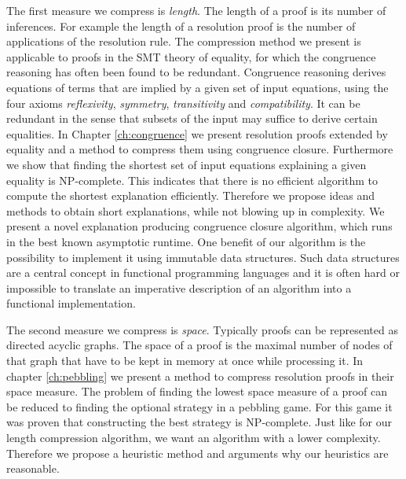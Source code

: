The first measure we compress is \emph{length}.
The length of a proof is its number of inferences.
For example the length of a resolution proof is the number of applications of the resolution rule.
The compression method we present is applicable to proofs in the SMT theory of equality, for which the congruence reasoning has often been found to be redundant.
Congruence reasoning derives equations of terms that are implied by a given set of input equations, 
using the four axioms \emph{reflexivity}, \emph{symmetry}, \emph{transitivity} and \emph{compatibility}. 
It can be redundant in the sense that subsets of the input may suffice to derive certain equalities.
In Chapter \ref{ch:congruence} we present resolution proofs extended by equality and a method to compress them using congruence closure.
Furthermore we show that finding the shortest set of input equations explaining a given equality is NP-complete.
This indicates that there is no efficient algorithm to compute the shortest explanation efficiently.
Therefore we propose ideas and methods to obtain short explanations, while not blowing up in complexity.
We present a novel explanation producing congruence closure algorithm, which runs in the best known asymptotic runtime.
One benefit of our algorithm is the possibility to implement it using immutable data structures.
Such data structures are a central concept in functional programming languages and it is often hard or impossible to translate an imperative description of an algorithm into a functional implementation.

The second measure we compress is \emph{space}.
Typically proofs can be represented as directed acyclic graphs.
The space of a proof is the maximal number of nodes of that graph that have to be kept in memory at once while processing it.
In chapter \ref{ch:pebbling} we present a method to compress resolution proofs in their space measure.
The problem of finding the lowest space measure of a proof can be reduced to finding the optional strategy in a pebbling game.
For this game it was proven that constructing the best strategy is NP-complete.
Just like for our length compression algorithm, we want an algorithm with a lower complexity.
Therefore we propose a heuristic method and arguments why our heuristics are reasonable.

